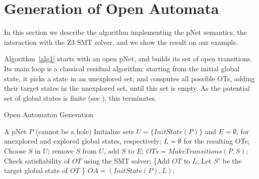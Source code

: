 \documentclass{lncs/llncs}
\newcommand{\noteSB}[2][color=green!40, size=\tiny]{\todo[#1]{{\bf
      Note: } {#2}}}
\newcommand{\noteEM}[2][color=blue!40, size=\tiny]{\todo[#1]{{\bf Eric: } {#2}}}
\newcommand{\ie}[1][\ ]{i.e.#1}
\begin{document}
\section{Generation of Open Automata}
\label{section:implementation}
In this section we describe the algorithm implementing the pNet
semantics, the interaction with the Z3 SMT solver, and we show the
result on our  example.

Algorithm~\ref{alg1} starts with an open pNet, and builds its set of open
transitions. Its main loop is a classical residual algorithm: starting
from the initial global state, it picks a state in an unexplored set, and
computes all possible OTs, adding their target states in the
unexplored set, until this set is empty. As the potential set of
global states is finite (see \cite{henrio:Forte2016}), this terminates.

\begin{algorithm}[h]
  \caption{Open Automaton Generation}
  \label{alg1}
\begin{algorithmic}[1]
\Require A pNet $P$ (cannot be a hole)
\State Initialize sets $U=\{\mathit{InitState}(P)\}$ and $E=\emptyset$,
for unexplored and explored global states, respectively; $L=\emptyset$ for the resulting OTs;
	\State Choose $S$ in $U$; remove $S$ from $U$, add $S$ to $E$;
	\State $\mathit{OTs} = \mathit{MakeTransitions}(P, S)$;
        Check satisfiability of $\mathit{OT}$ using the SMT solver;
                {\State \{Add $\mathit{OT}$ to $L$;
                  \State Let $S'$ be the target global state of $\mathit{OT}$
                  \}}
	\EndFor
\EndWhile
\State \Return $\mathit{OA}=(\mathit{InitState}(P),L)$;

\end{algorithmic}  
\end{algorithm}
\end{document}
